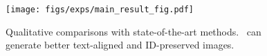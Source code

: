 \begin{figure}[t]
  \centering
  \texttt{[image: figs/exps/main\_result\_fig.pdf]}
  \caption{Qualitative comparisons with state-of-the-art methods. \ours \  can generate better text-aligned and ID-preserved images.}
  \label{fig:main_result}
\end{figure}